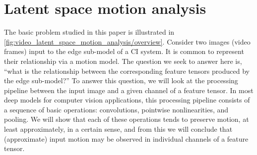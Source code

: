 













\section{Latent space motion analysis}
\label{sec:video_latent_space_motion_analysis/motion_analysis}

The basic problem studied in this paper is illustrated in \cref{fig:video_latent_space_motion_analysis/overview}. Consider two images (video frames) input to the edge sub-model of a CI system. It is common to represent their relationship via a motion model. The question we seek to answer here is, ``what is the relationship between the corresponding feature tensors produced by the edge sub-model?'' To answer this question, we will look at the processing pipeline between the input image and a given channel of a feature tensor. In most deep models for computer vision applications, this processing pipeline consists of a sequence of basic operations: convolutions, pointwise nonlinearities, and pooling.  We will show that each of these operations tends to preserve motion, at least approximately, in a certain sense, and from this we will conclude that (approximate) input motion may be observed in individual channels of a feature tensor.

